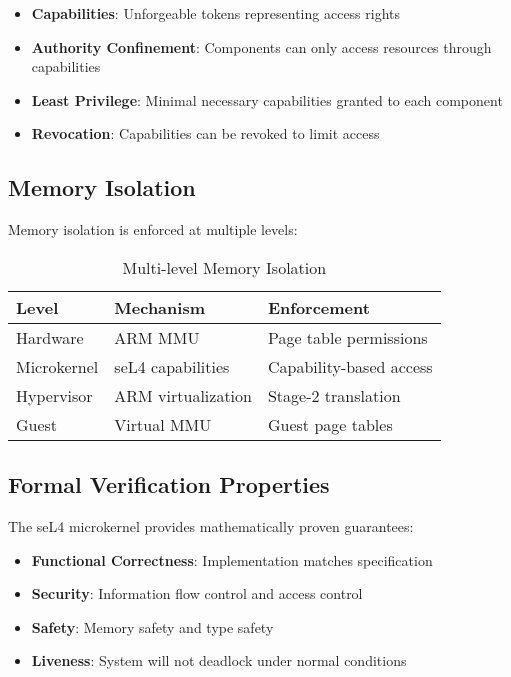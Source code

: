 \documentclass[12pt,a4paper]{article}
\begin{document}
\begin{itemize}
    \item \textbf{Capabilities}: Unforgeable tokens representing access rights
    \item \textbf{Authority Confinement}: Components can only access resources through capabilities
    \item \textbf{Least Privilege}: Minimal necessary capabilities granted to each component
    \item \textbf{Revocation}: Capabilities can be revoked to limit access
\end{itemize}

\subsection{Memory Isolation}

Memory isolation is enforced at multiple levels:

\begin{table}[h!]
\centering
\begin{tabular}{@{}lll@{}}
\toprule
\textbf{Level} & \textbf{Mechanism} & \textbf{Enforcement} \\
\midrule
Hardware & ARM MMU & Page table permissions \\
Microkernel & seL4 capabilities & Capability-based access \\
Hypervisor & ARM virtualization & Stage-2 translation \\
Guest & Virtual MMU & Guest page tables \\
\bottomrule
\end{tabular}
\caption{Multi-level Memory Isolation}
\end{table}

\subsection{Formal Verification Properties}

The seL4 microkernel provides mathematically proven guarantees:

\begin{itemize}
    \item \textbf{Functional Correctness}: Implementation matches specification
    \item \textbf{Security}: Information flow control and access control
    \item \textbf{Safety}: Memory safety and type safety
    \item \textbf{Liveness}: System will not deadlock under normal conditions
\end{itemize}
\end{document}
